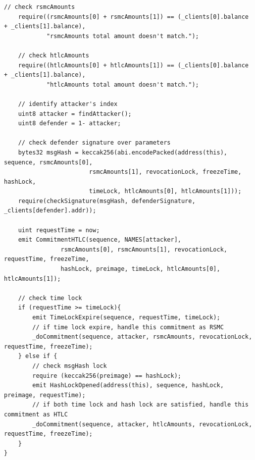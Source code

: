 \begin{appendices}
\begin{lstlisting}[caption={兑现HTLC共同承诺}, label={lst:cashHtlc}]
    // check rsmcAmounts
    require((rsmcAmounts[0] + rsmcAmounts[1]) == (_clients[0].balance + _clients[1].balance), 
            "rsmcAmounts total amount doesn't match.");
    
    // check htlcAmounts
    require((htlcAmounts[0] + htlcAmounts[1]) == (_clients[0].balance + _clients[1].balance), 
            "htlcAmounts total amount doesn't match.");
    
    // identify attacker's index
    uint8 attacker = findAttacker();
    uint8 defender = 1- attacker;
    
    // check defender signature over parameters
    bytes32 msgHash = keccak256(abi.encodePacked(address(this), sequence, rsmcAmounts[0], 
                        rsmcAmounts[1], revocationLock, freezeTime, hashLock, 
                        timeLock, htlcAmounts[0], htlcAmounts[1]));
    require(checkSignature(msgHash, defenderSignature, _clients[defender].addr));
    
    uint requestTime = now;
    emit CommitmentHTLC(sequence, NAMES[attacker], 
                rsmcAmounts[0], rsmcAmounts[1], revocationLock, requestTime, freezeTime,
                hashLock, preimage, timeLock, htlcAmounts[0], htlcAmounts[1]);
    
    // check time lock
    if (requestTime >= timeLock){
        emit TimeLockExpire(sequence, requestTime, timeLock);
        // if time lock expire, handle this commitment as RSMC
        _doCommitment(sequence, attacker, rsmcAmounts, revocationLock, requestTime, freezeTime);
    } else if {
        // check msgHash lock
        require (keccak256(preimage) == hashLock);
        emit HashLockOpened(address(this), sequence, hashLock, preimage, requestTime);
        // if both time lock and hash lock are satisfied, handle this commitment as HTLC
        _doCommitment(sequence, attacker, htlcAmounts, revocationLock, requestTime, freezeTime);
    }
}
\end{lstlisting}


\end{appendices}
